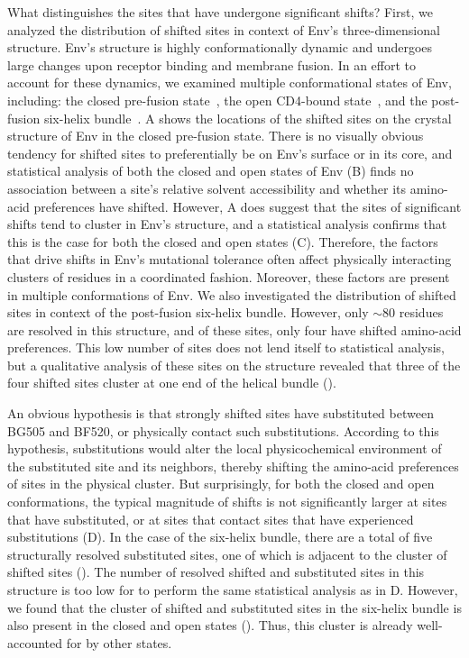 \documentclass[9pt]{elife}
\begin{document}
What distinguishes the sites that have undergone significant shifts?
First, we analyzed the distribution of shifted sites in context of Env's three-dimensional structure.
Env's structure is highly conformationally dynamic and undergoes large changes upon receptor binding and membrane fusion.
In an effort to account for these dynamics, we examined multiple conformational states of Env, including: the closed pre-fusion state~\cite{julien2013crystal,pancera2014structure,stewart2016trimeric}, the open CD4-bound state~\cite{pancera2010structure,ozorowski2017open}, and the post-fusion six-helix bundle~\cite{weissenhorn1997atomic,chan1997core,tan1997atomic}.
A shows the locations of the shifted sites on the crystal structure of Env in the closed pre-fusion state.
There is no visually obvious tendency for shifted sites to preferentially be on Env's surface or in its core, and statistical analysis of both the closed and open states of Env (B) finds no association between a site's relative solvent accessibility and whether its amino-acid preferences have shifted.
However, A does suggest that the sites of significant shifts tend to cluster in Env's structure, and a statistical analysis confirms that this is the case for both the closed and open states (C).
Therefore, the factors that drive shifts in Env's mutational tolerance often affect physically interacting clusters of residues in a coordinated fashion.
Moreover, these factors are present in multiple conformations of Env.
We also investigated the distribution of shifted sites in context of the post-fusion six-helix bundle.
However, only $\sim$80 residues are resolved in this structure, and of these sites, only four have shifted amino-acid preferences.
This low number of sites does not lend itself to statistical analysis, but a qualitative analysis of these sites on the structure revealed that three of the four shifted sites cluster at one end of the helical bundle ().

An obvious hypothesis is that strongly shifted sites have substituted between BG505 and BF520, or physically contact such substitutions.
According to this hypothesis, substitutions would alter the local physicochemical environment of the substituted site and its neighbors, thereby shifting the amino-acid preferences of sites in the physical cluster.
But surprisingly, for both the closed and open conformations, the typical magnitude of shifts is not significantly larger at sites that have substituted, or at sites that contact sites that have experienced substitutions (D).
In the case of the six-helix bundle, there are a total of five structurally resolved substituted sites, one of which is adjacent to the cluster of shifted sites ().
The number of resolved shifted and substituted sites in this structure is too low for to perform the same statistical analysis as in D.
However, we found that the cluster of shifted and substituted sites in the six-helix bundle is also present in the closed and open states ().
Thus, this cluster is already well-accounted for by other states.
\end{document}
